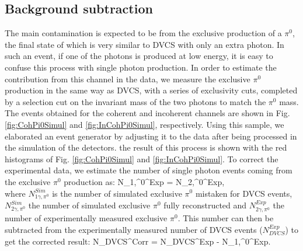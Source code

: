 \documentclass{article}
\let\oldequation\equation
\let\oldendequation\endequation
\renewenvironment{equation}
  {\linenomathNonumbers\oldequation}
  {\oldendequation\endlinenomath}
\begin{document}
\subsection{Background subtraction}

The main contamination is expected to be 
from the exclusive production of a $\pi^0$, the final state of which is very similar to DVCS with 
only an extra photon. In such an event, if one of the photons is produced at low energy, it is 
easy to confuse this process with single photon production. In order to estimate the contribution from
this channel in the data, we measure the exclusive $\pi^0$ production in the same way as DVCS, with 
a series of exclusivity cuts, completed by a selection cut on the invariant mass of the two photons
to match the $\pi^0$ mass. The events obtained for the coherent and incoherent
channels are shown in Fig. \ref{fig:CohPi0Simul} and \ref{fig:InCohPi0Simul}, respectively. Using 
this sample, we elaborated an event generator by adjusting it to the data after being processed
in the simulation of the detectors. the result of this process is shown with the red histograms 
of Fig. \ref{fig:CohPi0Simul} and 
\ref{fig:InCohPi0Simul}. To correct the experimental data, we estimate the number of single photon 
events coming from the exclusive $\pi^0$ production as:
\begin{equation}
	N_{1\gamma,\pi^0}^{Exp} =  \times N_{2\gamma,\pi^0}^{Exp},\\
\end{equation}
where $N_{1\gamma,\pi^0}^{Sim}$ is the number of simulated exclusive $\pi^0$ mistaken for DVCS events,
$N_{2\gamma,\pi^0}^{Sim}$ the number of simulated exclusive $\pi^0$ fully reconstructed and $N_{2\gamma,\pi^0}^{Exp}$
the number of experimentally measured exclusive $\pi^0$. This number can then be subtracted from
the experimentally measured number of DVCS events ($N_{DVCS}^{Exp}$) to get the corrected result: 
\begin{equation}
	N_{DVCS}^{Corr} = N_{DVCS}^{Exp} - N_{1\gamma,\pi^0}^{Exp}.\\
\end{equation}
\end{document}
